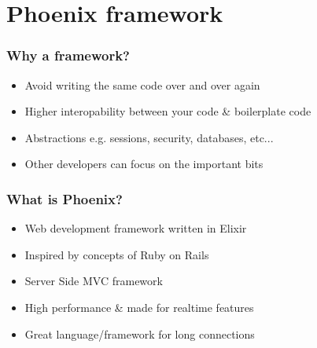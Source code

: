 \section{Phoenix framework}

\frame{\tableofcontents[currentsection]}

\begin{frame}
    \frametitle{Why a framework?}
    \begin{itemize}
        \item Avoid writing the same code over and over again
        \item Higher interopability between your code \& boilerplate code
        \item Abstractions e.g. sessions, security, databases, etc...
        \item Other developers can focus on the important bits
    \end{itemize}
\end{frame}

\begin{frame}
    \frametitle{What is Phoenix?}
    \begin{itemize}
        \item Web development framework written in Elixir
        \item Inspired by concepts of Ruby on Rails
        \item Server Side MVC framework
        \item High performance \& made for realtime features
        \item Great language/framework for long connections
    \end{itemize}
\end{frame}